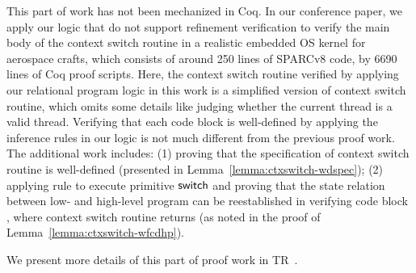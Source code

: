 This part of work has not been mechanized in Coq. 
In our conference paper, we apply our logic that 
do not support refinement verification to verify 
the main body of the context switch routine in 
a realistic embedded OS kernel for aerospace crafts, 
which consists of around 250 lines of SPARCv8 code, 
by 6690 lines of Coq proof scripts. Here, the 
context switch routine verified by applying our 
relational program logic in this work is a 
simplified version of context switch routine, 
which omits some details like judging whether the 
current thread is a valid thread. 
Verifying that each code block is well-defined 
by applying the inference rules in our logic is 
not much different from the previous proof work. 
The additional work includes: 
(1) proving that the specification of context 
switch routine is well-defined (presented in 
Lemma~\ref{lemma:ctxswitch-wdspec}); 
(2) applying  rule to execute 
primitive $\mathsf{switch}$ and proving that the state 
relation between low- and high-level program 
can be reestablished in verifying code block 
\SwitchNewTask{}, where context switch routine 
returns (as noted in the proof of 
Lemma~\ref{lemma:ctxswitch-wfcdhp}). 

We present more details of this part of proof 
work in TR~\cite{coqimp}.